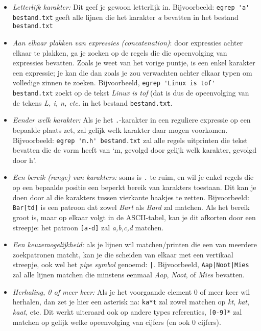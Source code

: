 \documentclass[a4paper,twoside,openany]{memoir}
\begin{document}
\begin{itemize}

  \item \emph{Letterlijk karakter:} Dit geef je gewoon letterlijk in.
    Bijvoorbeeld: \verb!egrep 'a' bestand.txt! geeft alle lijnen die het
    karakter \emph{a} bevatten in het bestand \verb!bestand.txt!

  \item \emph{Aan elkaar plakken van expressies (concatenation)}: door
    expressies achter elkaar te plakken, ga je zoeken op de regels die die
    opeenvolging van expressies bevatten. Zoals je weet van het vorige puntje,
    is een enkel karakter een expressie; je kan die dan zoals je zou verwachten
    achter elkaar typen om volledige zinnen te zoeken. Bijvoorbeeld,
    \verb!egrep 'Linux is tof' bestand.txt! zoekt op de tekst \emph{Linux is
    tof} (dat is dus de opeenvolging van de tekens \emph{L, i, n, etc.} in het
    bestand \verb!bestand.txt!.

  \item \emph{Eender welk karakter:} Als je het \verb!.!-karakter in een
    reguliere expressie op een bepaalde plaats zet, zal gelijk welk karakter
    daar mogen voorkomen. Bijvoorbeeld: \verb!egrep 'm.h' bestand.txt! zal alle
    regels uitprinten die tekst bevatten die de vorm heeft van `m, gevolgd door
    gelijk welk karakter, gevolgd door h'.

  \item \emph{Een bereik (range) van karakters:} soms is \verb!.! te ruim, en
    wil je enkel regels die op een bepaalde positie een beperkt bereik van
    karakters toestaan. Dit kan je doen door al die karakters tussen vierkante
    haakjes te zetten. Bijvoorbeeld: \verb!Bar[td]! is een patroon dat zowel
    \emph{Bart} als \emph{Bard} zal matchen. Als het bereik groot is, maar op
    elkaar volgt in de ASCII-tabel, kan je dit afkorten door een streepje: het
    patroon \verb![a-d]! zal \emph{a,b,c,d} matchen.

  \item \emph{Een keuzemogelijkheid:} als je lijnen wil matchen/printen die een
    van meerdere zoekpatronen matcht, kan je die scheiden van elkaar met een
    vertikaal streepje, ook wel het \emph{pipe symbol} genoemd: \verb!|!.
    Bijvoorbeeld, \verb!Aap|Noot|Mies! zal alle lijnen matchen die minstens
    eenmaal \emph{Aap}, \emph{Noot}, of \emph{Mies} bevatten.

  \item \emph{Herhaling, 0 of meer keer:} Als je het voorgaande element 0 of
    meer keer wil herhalen, dan zet je hier een asterisk na: \verb!ka*t! zal
    zowel matchen op \emph{kt}, \emph{kat}, \emph{kaat}, etc. Dit werkt
    uiteraard ook op andere types referenties, \verb![0-9]*! zal matchen op
    gelijk welke opeenvolging van cijfers (en ook 0 cijfers).


\end{itemize}
\end{document}
